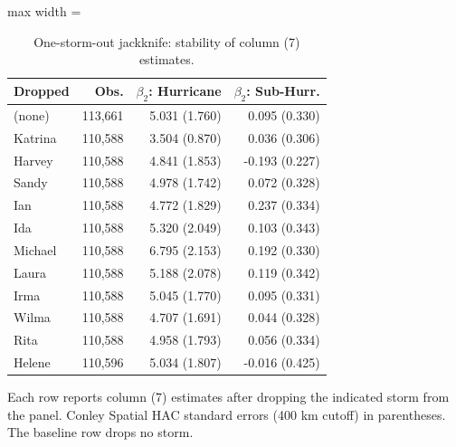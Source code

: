 \begin{table}

\caption{One-storm-out jackknife: stability of column (7) estimates. \label{tab:appA_jackknife}}
\centering
\begin{adjustbox}{max width = \textwidth}
\begin{threeparttable}
\begin{tabular}[t]{lrrr}
\toprule
Dropped & Obs. & $\beta_2$: Hurricane & $\beta_2$: Sub-Hurr.\\
\midrule
(none) & 113,661 & 5.031 (1.760) & 0.095 (0.330)\\
Katrina & 110,588 & 3.504 (0.870) & 0.036 (0.306)\\
Harvey & 110,588 & 4.841 (1.853) & -0.193 (0.227)\\
Sandy & 110,588 & 4.978 (1.742) & 0.072 (0.328)\\
Ian & 110,588 & 4.772 (1.829) & 0.237 (0.334)\\
Ida & 110,588 & 5.320 (2.049) & 0.103 (0.343)\\
Michael & 110,588 & 6.795 (2.153) & 0.192 (0.330)\\
Laura & 110,588 & 5.188 (2.078) & 0.119 (0.342)\\
Irma & 110,588 & 5.045 (1.770) & 0.095 (0.331)\\
Wilma & 110,588 & 4.707 (1.691) & 0.044 (0.328)\\
Rita & 110,588 & 4.958 (1.793) & 0.056 (0.334)\\
Helene & 110,596 & 5.034 (1.807) & -0.016 (0.425)\\
\bottomrule
\end{tabular}
\begin{tablenotes}
\small
\item Each row reports column (7) estimates after dropping the indicated storm from the panel. Conley Spatial HAC standard errors (400 km cutoff) in parentheses. The baseline row drops no storm.
\end{tablenotes}
\end{threeparttable}
\end{adjustbox}
\end{table}
